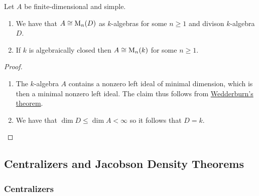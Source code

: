 \begin{corollary}[Wedderburn]
  \label{corollary: wedderburn for algebras}
  Let $A$ be finite-dimensional and simple.
  \begin{enumerate}
    \item
      We have that $A \cong \operatorname{M}_n(D)$ as $k$-algebras for some $n \geq 1$ and divison $k$-algebra $D$.
    \item
      If $k$ is algebraically closed then $A \cong \operatorname{M}_n(k)$ for some $n \geq 1$.
  \end{enumerate}
\end{corollary}


\begin{proof}
  \leavevmode
  \begin{enumerate}
    \item
      The $k$-algebra $A$ contains a nonzero left ideal of minimal dimension, which is then a minimal nonzero left ideal.
      The claim thus follows from \hyperref[theorem: wedderburns theorem]{Wedderburn’s theorem}.
    \item
      We have that $\dim D \leq \dim A < \infty$ so it follows that $D = k$.
    \qedhere
  \end{enumerate}
\end{proof}





\subsection*{Centralizers and Jacobson Density Theorems}



\subsubsection{Centralizers}

